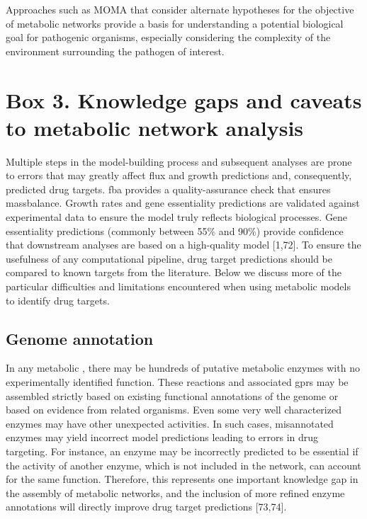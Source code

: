 Approaches such as MOMA that consider alternate hypotheses 
for the objective of metabolic networks provide a basis 
for understanding a potential biological goal for pathogenic 
organisms, especially considering the complexity of the 
environment surrounding the pathogen of interest.

\section{Box 3. Knowledge gaps and caveats to metabolic network analysis}
Multiple steps in the model-building process and subsequent 
analyses are prone to errors that may greatly affect \gls{flux} 
and growth predictions and, consequently, predicted drug 
targets. \gls{fba} provides a quality-assurance check that ensures 
\gls{massbalance}. Growth rates and gene essentiality predictions 
are validated against experimental data to ensure the 
model truly reflects biological processes. Gene essentiality 
predictions (commonly between 55\% and 90\%) provide 
confidence that downstream analyses are based on a 
high-quality model [1,72]. To ensure the usefulness of 
any computational pipeline, drug target predictions 
should be compared to known targets from the literature. 
Below we discuss more of the particular difficulties and 
limitations encountered when using metabolic models to 
identify drug targets.

\subsection{Genome annotation}
In any metabolic , there may be 
hundreds of putative metabolic enzymes with no 
experimentally identified function. These reactions 
and associated \glspl{gpr} may be assembled 
strictly based on existing functional annotations 
of the genome or based on evidence from related 
organisms. Even some very well characterized enzymes 
may have other unexpected activities. In such cases, 
misannotated enzymes may yield incorrect model 
predictions leading to errors in drug targeting. For 
instance, an enzyme may be incorrectly predicted to be 
essential if the activity of another enzyme, which is 
not included in the network, can account for the same function. 
Therefore, this represents one important knowledge gap in 
the assembly of metabolic networks, and the inclusion of 
more refined enzyme annotations will directly improve 
drug target predictions [73,74].

